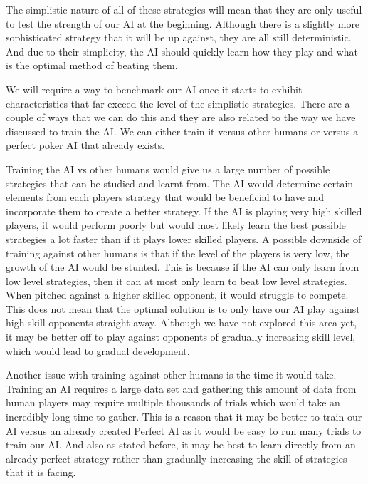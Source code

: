 \documentclass{article}
\begin{document}
\begin{multicols*}{2}
The simplistic nature of all of these strategies will mean that they are only useful to test the strength of our AI at the beginning. Although there is a slightly more sophisticated strategy that it will be up against, they are all still deterministic. And due to their simplicity, the AI should quickly learn how they play and what is the optimal method of beating them.
\newline

We will require a way to benchmark our AI once it starts to exhibit characteristics that far exceed the level of the simplistic strategies. There are a couple of ways that we can do this and they are also related to the way we have discussed to train the AI. We can either train it versus other humans or versus a perfect poker AI that already exists.
\newline

Training the AI vs other humans would give us a large number of possible strategies that can be studied and learnt from. The AI would determine certain elements from each players strategy that would be beneficial to have and incorporate them to create a better strategy. If the AI is playing very high skilled players, it would perform poorly but would most likely learn the best possible strategies a lot faster than if it plays lower skilled players. A possible downside of training against other humans is that if the level of the players is very low, the growth of the AI would be stunted. This is because if the AI can only learn from low level strategies, then it can at most only learn to beat low level strategies. When pitched against a higher skilled opponent, it would struggle to compete. This does not mean that the optimal solution is to only have our AI play against high skill opponents straight away. Although we have not explored this area yet, it may be better off to play against opponents of gradually increasing skill level, which would lead to gradual development.
\newline

Another issue with training against other humans is the time it would take. Training an AI requires a large data set and gathering this amount of data from human players may require multiple thousands of trials which would take an incredibly long time to gather. This is a reason that it may be better to train our AI versus an already created Perfect AI as it would be easy to run many trials to train our AI. And also as stated before, it may be best to learn directly from an already perfect strategy rather than gradually increasing the skill of strategies that it is facing.


\end{multicols*}
\end{document}
